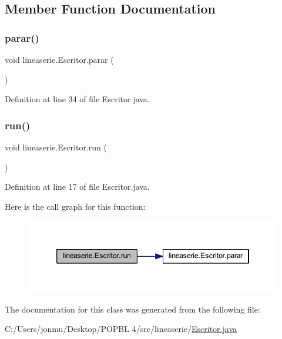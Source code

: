 \subsection{Member Function Documentation}
\mbox{\label{classlineaserie_1_1_escritor_acd4e96fe60f601259643fa12d15b5387}} 
\subsubsection{\texorpdfstring{parar()}{parar()}}
{\footnotesize\ttfamily void lineaserie.\+Escritor.\+parar (\begin{DoxyParamCaption}{ }\end{DoxyParamCaption})}



Definition at line 34 of file Escritor.\+java.

\mbox{\label{classlineaserie_1_1_escritor_a510a437d7f0ed6a89fb326b6d03e4d6c}} 
\subsubsection{\texorpdfstring{run()}{run()}}
{\footnotesize\ttfamily void lineaserie.\+Escritor.\+run (\begin{DoxyParamCaption}{ }\end{DoxyParamCaption})}



Definition at line 17 of file Escritor.\+java.

Here is the call graph for this function\+:\nopagebreak
\begin{figure}[H]
\begin{center}
\leavevmode
\includegraphics[width=346pt]{classlineaserie_1_1_escritor_a510a437d7f0ed6a89fb326b6d03e4d6c_cgraph}
\end{center}
\end{figure}


The documentation for this class was generated from the following file\+:\begin{DoxyCompactItemize}
\item 
C\+:/\+Users/jonmu/\+Desktop/\+P\+O\+P\+B\+L 4/src/lineaserie/\mbox{\hyperlink{_escritor_8java}{Escritor.\+java}}\end{DoxyCompactItemize}
